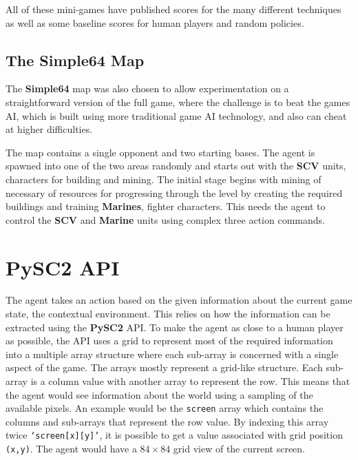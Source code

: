 All of these mini-games have published scores for the many different
techniques as well as some baseline scores for human players and random
policies.

\subsection{The \textbf{Simple64} Map}

The \textbf{Simple64} map was also chosen to allow experimentation on
a straightforward version of the full game, where the challenge is
to beat the games AI, which is built using more traditional game AI
technology, and also can cheat at higher difficulties.

The map contains a single opponent and two starting bases. The agent is spawned
into one of the two areas randomly and starts out with the \textbf{SCV} units,
characters for building and mining. The initial stage begins with mining of
necessary of resources for progressing through the level by creating the required
buildings and training \textbf{Marines}, fighter characters. This needs the
agent to control the \textbf{SCV} and \textbf{Marine} units using complex three
action commands.

\section{PySC2 API}


The agent takes an action based on the given information about the current game
state, the contextual environment. This relies on how the information can be
extracted using the \textbf{PySC2} API\@. To make the agent as close to a human
player as possible, the API uses a grid to represent most of the required
information into a multiple array structure where each sub-array is concerned
with a single aspect of the game. The arrays mostly represent a grid-like
structure. Each sub-array is a column value with another array to represent the
row. This means that the agent would see information about the world using a
sampling of the available pixels. An example would be the \texttt{screen} array
which contains the columns and sub-arrays that represent the row value. By
indexing this array twice \texttt{`screen[x][y]'}, it is possible to get a value
associated with grid position \texttt{(x,y)}. The agent would have a $84 \times
84$ grid view of the current screen.

